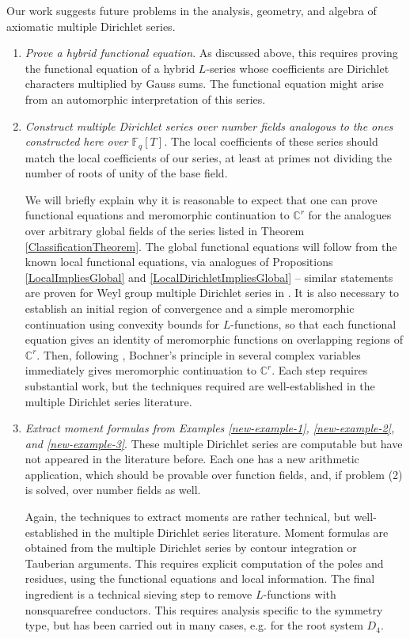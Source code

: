 \documentclass[11pt,letterpaper]{article}
\theoremstyle{definition}
\theoremstyle{remark}
\numberwithin{equation}{section}
\theoremstyle{dotless}
\newcommand{\C}{\mathbb{C}}
\begin{document}
Our work suggests future problems in the analysis, geometry, and algebra of axiomatic multiple Dirichlet series. 

\begin{enumerate} 

\item \emph{Prove a hybrid functional equation}. As discussed above, this requires proving the functional equation of a hybrid $L$-series whose coefficients are Dirichlet characters multiplied by Gauss sums. The functional equation might arise from an automorphic interpretation of this series.

\item \emph{Construct multiple Dirichlet series over number fields analogous to the ones constructed here over $\mathbb F_q[T]$.}  The local coefficients of these series should match the local coefficients of our series, at least at primes not dividing the number of roots of unity of the base field.

We will briefly explain why it is reasonable to expect that one can prove functional equations and meromorphic continuation to $\C^r$ for the analogues over arbitrary global fields of the series listed in Theorem \ref{ClassificationTheorem}. The global functional equations will follow from the known local functional equations, via analogues of Propositions \ref{LocalImpliesGlobal} and \ref{LocalDirichletImpliesGlobal} -- similar statements are proven for Weyl group multiple Dirichlet series in \cite{ChintaGunnellsJAMS}. It is also necessary to establish an initial region of convergence and a simple meromorphic continuation using convexity bounds for $L$-functions, so that each functional equation gives an identity of meromorphic functions on overlapping regions of $\C^r$. Then, following \cite{DiaconuGoldfeldHoffstein}, Bochner's principle in several complex variables immediately gives meromorphic continuation to $\C^r$. Each step requires substantial work, but the techniques required are well-established in the multiple Dirichlet series literature. 

\item \emph{Extract moment formulas from Examples \ref{new-example-1}, \ref{new-example-2}, and \ref{new-example-3}}. These multiple Dirichlet series are computable but have not appeared in the literature before. Each one has a new arithmetic application, which should be provable over function fields, and, if problem (2) is solved, over number fields as well.

Again, the techniques to extract moments are rather technical, but well-established in the multiple Dirichlet series literature. Moment formulas are obtained from the multiple Dirichlet series by contour integration or Tauberian arguments. This requires explicit computation of the poles and residues, using the functional equations and local information. The final ingredient is a technical sieving step to remove $L$-functions with nonsquarefree conductors. This requires analysis specific to the symmetry type, but has been carried out in many cases, e.g. \cite{Diaconu, DiaconuWhitehead} for the root system $D_4$. 


\end{enumerate}
\end{document}

